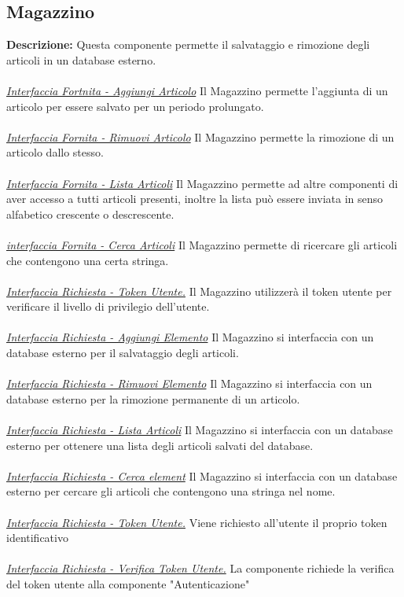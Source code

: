 \documentclass{report}
\begin{document}
\subsection*{Magazzino}
\textbf{Descrizione: } Questa componente permette il salvataggio e rimozione degli articoli in un database esterno.\\ \\
\uline{\textit{Interfaccia Fortnita - Aggiungi Articolo}}
Il Magazzino permette l'aggiunta di un articolo per essere salvato per un periodo prolungato.\\ \\
\uline{\textit{Interfaccia Fornita - Rimuovi Articolo}}
Il Magazzino permette la rimozione di un articolo dallo stesso.\\ \\
\uline{\textit{Interfaccia Fornita - Lista Articoli}}
Il Magazzino permette ad altre componenti di aver accesso a tutti articoli presenti, inoltre la lista può essere inviata in senso alfabetico crescente o descrescente.\\ \\
\uline{\textit{interfaccia Fornita - Cerca Articoli}}
Il Magazzino permette di ricercare gli articoli che contengono una certa stringa.\\ \\
\uline{\textit{Interfaccia Richiesta - Token Utente.}} Il Magazzino utilizzerà il token utente per verificare il livello di privilegio dell'utente.\\ \\
\uline{\textit{Interfaccia Richiesta - Aggiungi Elemento}}
Il Magazzino si interfaccia con un database esterno per il salvataggio degli articoli.\\ \\
\uline{\textit{Interfaccia Richiesta - Rimuovi Elemento}}
Il Magazzino si interfaccia con un database esterno per la rimozione permanente di un articolo.\\ \\
\uline{\textit{Interfaccia Richiesta - Lista Articoli}}
Il Magazzino si interfaccia con un database esterno per ottenere una lista degli articoli salvati del database.\\ \\
\uline{\textit{Interfaccia Richiesta - Cerca element}}
Il Magazzino si interfaccia con un database esterno per cercare gli articoli che contengono una stringa nel nome.\\ \\
\uline{\textit{Interfaccia Richiesta - Token Utente.}} 
Viene richiesto all'utente il proprio token identificativo\\ \\
\uline{\textit{Interfaccia Richiesta - Verifica Token Utente.}} 
La componente richiede la verifica del token utente alla componente "Autenticazione"\\\\
\end{document}
